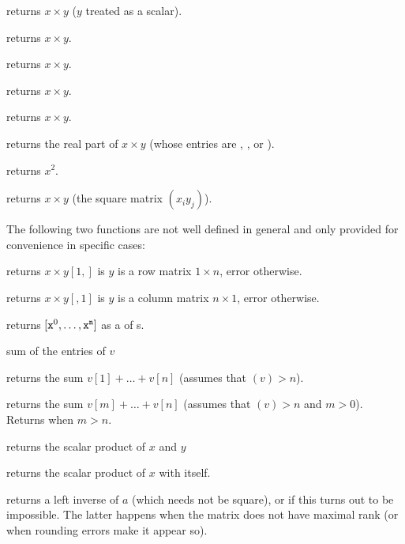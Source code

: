 

 returns $x\times y$ ($y$ treated as a
scalar).

 returns $x\times y$.

 returns $x\times y$.

 returns $x\times y$.

 returns $x\times y$.

 returns the real part of $x\times y$
(whose entries are , ,  or ).

 returns $x^2$.

 returns $x\times y$ (the square matrix
$(x_iy_j)$).

The following two functions are not well defined in general and only provided
for convenience in specific cases:

 returns $x\times y[1,]$ is $y$ is
a row matrix $1\times n$, error otherwise.

 returns $x\times y[,1]$ is $y$ is
a column matrix $n\times 1$, error otherwise.

 returns $[{\tt x}^0,
\dots, {\tt x}^{\tt n}]$ as a  of s.

\smallskip
{} sum of the entries of $v$

 returns the sum $v[1] + \dots + v[n]$
(assumes that $(v) > n$).

 returns the sum $v[m] + \dots +
v[n]$ (assumes that $(v) > n$ and $m > 0$). Returns 
when $m > n$.

 returns the scalar product of $x$ and $y$

 returns the scalar product of $x$ with itself.

 returns a left inverse of $a$ (which needs not be
square), or  if this turns out to be impossible. The latter
happens when the matrix does not have maximal rank (or when rounding errors
make it appear so).

